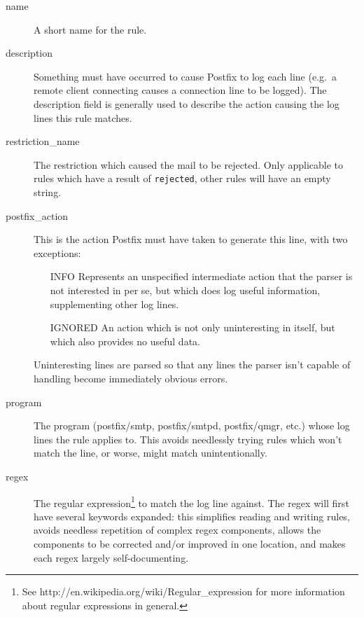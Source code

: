 \documentclass[a4paper,12pt,draft]{article}
\begin{document}
\begin{description}

    \item [name] A short name for the rule.

    \item [description] Something must have occurred to cause Postfix to
        log each line (e.g.\ a remote client connecting causes a connection
        line to be logged).  The description field is generally used to
        describe the action causing the log lines this rule matches.

    \item [restriction\_name] The restriction which caused the mail to be
        rejected.  Only applicable to rules which have a result of
        \texttt{rejected}, other rules will have an empty string.

    \item [postfix\_action] This is the action Postfix must have taken to
        generate this line, with two exceptions:

        \begin{itemize}

            \item [INFO] Represents an unspecified intermediate action that
                the parser is not interested in per se, but which does log
                useful information, supplementing other log lines.

            \item [IGNORED] An action which is not only uninteresting in
                itself, but which also provides no useful data.

        \end{itemize}

        Uninteresting lines are parsed so that any lines the parser isn't
        capable of handling become immediately obvious errors.

    \item [program] The program (postfix/smtp, postfix/smtpd, postfix/qmgr,
        etc.) whose log lines the rule applies to.  This avoids needlessly
        trying rules which won't match the line, or worse, might match
        unintentionally.

    \item [regex] The regular expression\footnote{See
        http://en.wikipedia.org/wiki/Regular\_expression for more
        information about regular expressions in general.} to match the log
        line against.  The regex will first have several keywords expanded:
        this simplifies reading and writing rules, avoids needless
        repetition of complex regex components, allows the components
        to be corrected and/or improved in one location, and makes each
        regex largely self-documenting.
        

\end{description}
\end{document}

